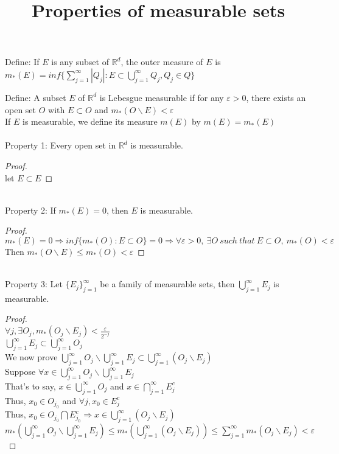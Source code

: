 \documentclass{article}
\begin{document}
\title{Properties of measurable sets}
\maketitle
Define: If $E$ is any subset of $\mathbb{R}^{d}$, the outer measure of $E$ is $m_{*}(E)=inf\{\sum_{j=1}^{\infty}\left|Q_{j}\right|:E\subset\bigcup_{j=1}^{\infty}Q_{j},Q_{j}\in Q\}$


Define: A subset $E$ of $\mathbb{R}^{d}$ is Lebesgue measurable if for any $\varepsilon>0$, there exists an open set $O$ with $E \subset O$ and $m_{*}(O\backslash E)<\varepsilon$ \\
If $E$ is measurable, we define its measure $m(E)$ by $m(E)=m_{*}(E)$\\
~\\
Property 1: Every open set in $\mathbb{R}^{d}$ is measurable.
\begin{proof}
	~\\
	let $E\subset E$
\end{proof}
~\\
Property 2: If $m_{*}(E)=0$, then $E$ is measurable. 
\begin{proof}
	~\\
	$m_{*}(E)=0 \Rightarrow inf\{m_{*}(O):E\subset O\}=0 \Rightarrow \forall \varepsilon>0,\ \exists O\ such\ that\ E\subset O,\  m_{*}(O)<\varepsilon$\\
	Then $m_{*}(O\backslash E)\leq m_{*}(O)<\varepsilon$
\end{proof}
~\\
Property 3: Let $\{E_{j}\}_{j=1}^{\infty}$ be a family of measurable sets, then $\bigcup_{j=1}^{\infty}E_{j}$ is measurable. 
\begin{proof}
	~\\
	$\forall j, \exists O_{j}, m_{*}(O_{j}\backslash E_{j})<\frac{\varepsilon}{2^{-j}}$\\
	$\bigcup_{j=1}^{\infty}E_{j}\subset \bigcup_{j=1}^{\infty}O_{j}$\\
	We now prove $\bigcup_{j=1}^{\infty}O_{j}\backslash \bigcup_{j=1}^{\infty}E_{j}\subset \bigcup_{j=1}^{\infty}(O_{j}\backslash E_{j})$\\
	Suppose $\forall x\in \bigcup_{j=1}^{\infty}O_{j}\backslash \bigcup_{j=1}^{\infty}E_{j}$\\
	That's to say, $x\in \bigcup_{j=1}^{\infty}O_{j}$ and $x\in \bigcap_{j=1}^{\infty}E_{j}^{c}$\\
	Thus, $x_{0}\in O_{j_{0}}$ and $\forall j, x_{0}\in E_{j}^{c}$\\
	Thus, $x_{0}\in O_{j_{0}}\bigcap E_{j_{0}}^{c}\Rightarrow x\in \bigcup_{j=1}^{\infty}(O_{j}\backslash E_{j})$\\
	$m_{*}(\bigcup_{j=1}^{\infty}O_{j}\backslash \bigcup_{j=1}^{\infty}E_{j})\leq m_{*}(\bigcup_{j=1}^{\infty}(O_{j}\backslash E_{j}))\leq \sum_{j=1}^{\infty}m_{*}(O_{j}\backslash E_{j})<\varepsilon$
\end{proof}
\end{document}
